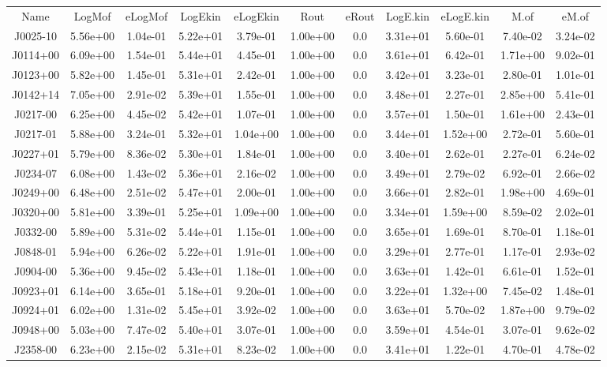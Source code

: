 \begin{table}
\begin{tabular}{ccccccccccc}
Name & LogMof & eLogMof & LogEkin & eLogEkin & Rout & eRout & LogE.kin & eLogE.kin & M.of & eM.of \\
J0025-10 & 5.56e+00 & 1.04e-01 & 5.22e+01 & 3.79e-01 & 1.00e+00 & 0.0 & 3.31e+01 & 5.60e-01 & 7.40e-02 & 3.24e-02 \\
J0114+00 & 6.09e+00 & 1.54e-01 & 5.44e+01 & 4.45e-01 & 1.00e+00 & 0.0 & 3.61e+01 & 6.42e-01 & 1.71e+00 & 9.02e-01 \\
J0123+00 & 5.82e+00 & 1.45e-01 & 5.31e+01 & 2.42e-01 & 1.00e+00 & 0.0 & 3.42e+01 & 3.23e-01 & 2.80e-01 & 1.01e-01 \\
J0142+14 & 7.05e+00 & 2.91e-02 & 5.39e+01 & 1.55e-01 & 1.00e+00 & 0.0 & 3.48e+01 & 2.27e-01 & 2.85e+00 & 5.41e-01 \\
J0217-00 & 6.25e+00 & 4.45e-02 & 5.42e+01 & 1.07e-01 & 1.00e+00 & 0.0 & 3.57e+01 & 1.50e-01 & 1.61e+00 & 2.43e-01 \\
J0217-01 & 5.88e+00 & 3.24e-01 & 5.32e+01 & 1.04e+00 & 1.00e+00 & 0.0 & 3.44e+01 & 1.52e+00 & 2.72e-01 & 5.60e-01 \\
J0227+01 & 5.79e+00 & 8.36e-02 & 5.30e+01 & 1.84e-01 & 1.00e+00 & 0.0 & 3.40e+01 & 2.62e-01 & 2.27e-01 & 6.24e-02 \\
J0234-07 & 6.08e+00 & 1.43e-02 & 5.36e+01 & 2.16e-02 & 1.00e+00 & 0.0 & 3.49e+01 & 2.79e-02 & 6.92e-01 & 2.66e-02 \\
J0249+00 & 6.48e+00 & 2.51e-02 & 5.47e+01 & 2.00e-01 & 1.00e+00 & 0.0 & 3.66e+01 & 2.82e-01 & 1.98e+00 & 4.69e-01 \\
J0320+00 & 5.81e+00 & 3.39e-01 & 5.25e+01 & 1.09e+00 & 1.00e+00 & 0.0 & 3.34e+01 & 1.59e+00 & 8.59e-02 & 2.02e-01 \\
J0332-00 & 5.89e+00 & 5.31e-02 & 5.44e+01 & 1.15e-01 & 1.00e+00 & 0.0 & 3.65e+01 & 1.69e-01 & 8.70e-01 & 1.18e-01 \\
J0848-01 & 5.94e+00 & 6.26e-02 & 5.22e+01 & 1.91e-01 & 1.00e+00 & 0.0 & 3.29e+01 & 2.77e-01 & 1.17e-01 & 2.93e-02 \\
J0904-00 & 5.36e+00 & 9.45e-02 & 5.43e+01 & 1.18e-01 & 1.00e+00 & 0.0 & 3.63e+01 & 1.42e-01 & 6.61e-01 & 1.52e-01 \\
J0923+01 & 6.14e+00 & 3.65e-01 & 5.18e+01 & 9.20e-01 & 1.00e+00 & 0.0 & 3.22e+01 & 1.32e+00 & 7.45e-02 & 1.48e-01 \\
J0924+01 & 6.02e+00 & 1.31e-02 & 5.45e+01 & 3.92e-02 & 1.00e+00 & 0.0 & 3.63e+01 & 5.70e-02 & 1.87e+00 & 9.79e-02 \\
J0948+00 & 5.03e+00 & 7.47e-02 & 5.40e+01 & 3.07e-01 & 1.00e+00 & 0.0 & 3.59e+01 & 4.54e-01 & 3.07e-01 & 9.62e-02 \\
J2358-00 & 6.23e+00 & 2.15e-02 & 5.31e+01 & 8.23e-02 & 1.00e+00 & 0.0 & 3.41e+01 & 1.22e-01 & 4.70e-01 & 4.78e-02 \\
\end{tabular}
\end{table}

